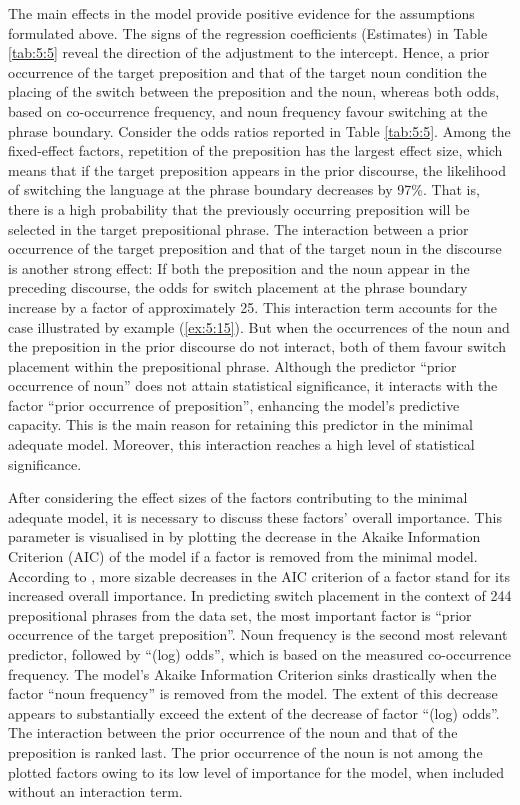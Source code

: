 The main effects in the model provide positive evidence for the assumptions formulated above. The signs of the regression coefficients (Estimates) in Table \ref{tab:5:5} reveal the direction of the adjustment to the intercept. Hence, a prior occurrence of the target preposition and that of the target noun condition the placing of the switch between the preposition and the noun, whereas both odds, based on co-occurrence frequency, and noun frequency favour switching at the phrase boundary. Consider the odds ratios reported in Table \ref{tab:5:5}. Among the fixed-effect factors, repetition of the preposition has the largest effect size, which means that if the target preposition appears in the prior discourse, the likelihood of switching the language at the phrase boundary decreases by 97\%. That is, there is a high probability that the previously occurring preposition will be selected in the target prepositional phrase. The interaction between a prior occurrence of the target preposition and that of the target noun in the discourse is another strong effect: If both the preposition and the noun appear in the preceding discourse, the odds for switch placement at the phrase boundary increase by a factor of approximately 25. This interaction term accounts for the case illustrated by example (\ref{ex:5:15}). But when the occurrences of the noun and the preposition in the prior discourse do not interact, both of them favour switch placement within the prepositional phrase. Although the predictor “prior occurrence of noun” does not attain statistical significance, it interacts with the factor “prior occurrence of preposition”, enhancing the model's predictive capacity. This is the main reason for retaining this predictor in the minimal adequate model. Moreover, this interaction reaches a high level of statistical significance.

After considering the effect sizes of the factors contributing to the minimal adequate model, it is necessary to discuss these factors’ overall importance. This parameter is visualised in  by plotting the decrease in the Akaike Information Criterion (AIC) of the model if a factor is removed from the minimal model. According to \citet{szmrecsanyi-2013}, more sizable decreases in the AIC criterion of a factor stand for its increased overall importance. In predicting switch placement in the context of 244 prepositional phrases from the data set, the most important factor is “prior occurrence of the target preposition”. Noun frequency is the second most relevant predictor, followed by “(log) odds”, which is based on the measured co-occurrence frequency. The model's Akaike Information Criterion sinks drastically when the factor “noun frequency” is removed from the model. The extent of this decrease appears to substantially exceed the extent of the decrease of factor “(log) odds”. The interaction between the prior occurrence of the noun and that of the preposition is ranked last. The prior occurrence of the noun is not among the plotted factors owing to its low level of importance for the model, when included without an interaction term.

